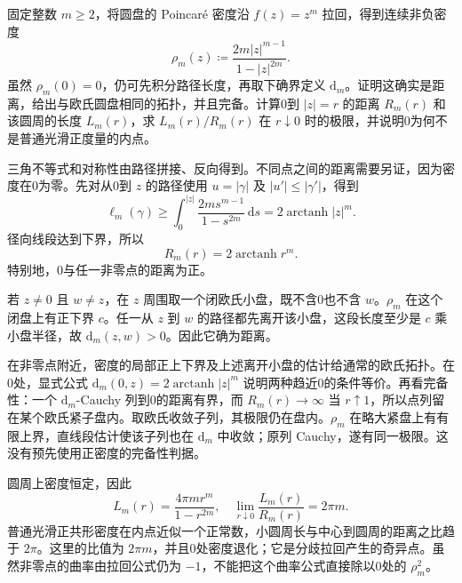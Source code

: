 \begin{exercise}[分歧拉回的路径几何]\label{b3:ex:14-3}
固定整数 \(m\ge2\)，将圆盘的 Poincaré 密度沿 \(f(z)=z^m\) 拉回，得到连续非负密度
\[
 \rho_m(z)\coloneqq\frac{2m|z|^{m-1}}{1-|z|^{2m}}.
\]
虽然 \(\rho_m(0)=0\)，仍可先积分路径长度，再取下确界定义 \(\mathrm d_m\)。证明这确实是距离，给出与欧氏圆盘相同的拓扑，并且完备。计算0到 \(|z|=r\) 的距离 \(R_m(r)\) 和该圆周的长度 \(L_m(r)\)，求 \(L_m(r)/R_m(r)\) 在 \(r\downarrow0\) 时的极限，并说明0为何不是普通光滑正度量的内点。
\end{exercise}
\begin{solution}
三角不等式和对称性由路径拼接、反向得到。不同点之间的距离需要另证，因为密度在0为零。先对从0到 \(z\) 的路径使用 \(u=|\gamma|\) 及 \(|u'|\le|\gamma'|\)，得到
\[
 \ell_m(\gamma)\ge\int_0^{|z|}\frac{2m s^{m-1}}{1-s^{2m}}\,\mathrm ds
 =2\operatorname{arctanh}|z|^m.
\]
径向线段达到下界，所以
\[
 R_m(r)=2\operatorname{arctanh}r^m.
\]
特别地，0与任一非零点的距离为正。

若 \(z\ne0\) 且 \(w\ne z\)，在 \(z\) 周围取一个闭欧氏小盘，既不含0也不含 \(w\)。\(\rho_m\) 在这个闭盘上有正下界 \(c\)。任一从 \(z\) 到 \(w\) 的路径都先离开该小盘，这段长度至少是 \(c\) 乘小盘半径，故 \(\mathrm d_m(z,w)>0\)。因此它确为距离。

在非零点附近，密度的局部正上下界及上述离开小盘的估计给通常的欧氏拓扑。在0处，显式公式 \(\mathrm d_m(0,z)=2\operatorname{arctanh}|z|^m\) 说明两种趋近0的条件等价。再看完备性：一个 \(\mathrm d_m\)-Cauchy 列到0的距离有界，而 \(R_m(r)\rightarrow\infty\) 当 \(r\uparrow1\)，所以点列留在某个欧氏紧子盘内。取欧氏收敛子列，其极限仍在盘内。\(\rho_m\) 在略大紧盘上有有限上界，直线段估计使该子列也在 \(\mathrm d_m\) 中收敛；原列 Cauchy，遂有同一极限。这没有预先使用正密度的完备性判据。

圆周上密度恒定，因此
\[
 L_m(r)=\frac{4\pi m r^m}{1-r^{2m}},\quad
 \lim_{r\downarrow0}\frac{L_m(r)}{R_m(r)}=2\pi m.
\]
普通光滑正共形密度在内点近似一个正常数，小圆周长与中心到圆周的距离之比趋于 \(2\pi\)。这里的比值为 \(2\pi m\)，并且0处密度退化；它是分歧拉回产生的奇异点。虽然非零点的曲率由拉回公式仍为 \(-1\)，不能把这个曲率公式直接除以0处的 \(\rho_m^2\)。
\end{solution}

